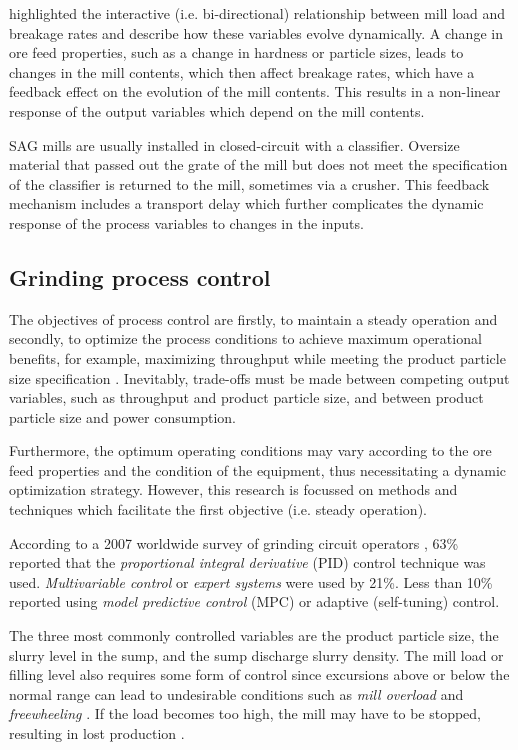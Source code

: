 \cite{powell_applying_2009} highlighted the interactive (i.e. bi-directional) relationship between mill load and breakage rates and describe how these variables evolve dynamically. A change in ore feed properties, such as a change in hardness or particle sizes, leads to changes in the mill contents, which then affect breakage rates, which have a feedback effect on the evolution of the mill contents. This results in a non-linear response of the output variables which depend on the mill contents.

SAG mills are usually installed in closed-circuit with a classifier. Oversize material that passed out the grate of the mill but does not meet the specification of the classifier is returned to the mill, sometimes via a crusher. This feedback mechanism includes a transport delay which further complicates the dynamic response of the process variables to changes in the inputs.

\subsection*{Grinding process control}

The objectives of process control are firstly, to maintain a steady operation and secondly, to optimize the process conditions to achieve maximum operational benefits, for example, maximizing throughput while meeting the product particle size specification \citep{wei_grinding_2009}. Inevitably, trade-offs must be made between competing output variables, such as throughput and product particle size, and between product particle size and power consumption.

Furthermore, the optimum operating conditions may vary according to the ore feed properties and the condition of the equipment, thus necessitating a dynamic optimization strategy. However, this research is focussed on methods and techniques which facilitate the first objective (i.e. steady operation).

According to a 2007 worldwide survey of grinding circuit operators \citep{wei_grinding_2009}, 63\% reported that the \textit{proportional integral derivative} (PID) control technique was used. \textit{Multivariable control} or \textit{expert systems} were used by 21\%. Less than 10\% reported using \textit{model predictive control} (MPC) or adaptive (self-tuning) control.

The three most commonly controlled variables are the product particle size, the slurry level in the sump, and the sump discharge slurry density. The mill load or filling level also requires some form of control since excursions above or below the normal range can lead to undesirable conditions such as \textit{mill overload} and \textit{freewheeling} \citep{mcclure_overload_2015}. If the load becomes too high, the mill may have to be stopped, resulting in lost production \citep{wei_grinding_2009}.


